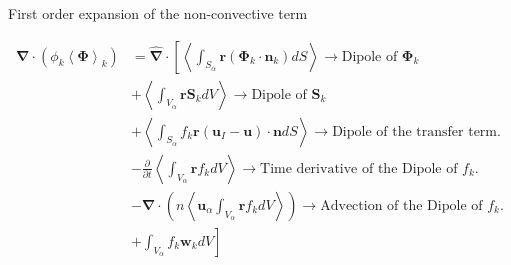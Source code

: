 \documentclass{sintefbeamer}
\newcommand{\kavg}[1]{\left<#1\right>_k}
\newcommand{\pavg}[1]{n \left<#1\right>}
\newcommand{\pnavg}[1]{\left<#1\right>}
\newcommand{\nablab}{\bm{\nabla}}
\newcommand{\nablabh}{\hat{\bm{\nabla}}}
\newcommand{\pddt}{\frac{\partial}{\partial t}}
\begin{document}
\begin{frame}
  {First order expansion of the non-convective term}

  \begin{align*}
    \nablab \cdot
    (\phi_k \kavg{\bm{\Phi}})
    & = \nablabh
    \cdot
    \left[
    \pnavg{\int_{S_\alpha}
    \textbf{r}
    (\bm{\Phi}_k \cdot \textbf{n}_k) dS}  \rightarrow \text{Dipole of $\mathbf{\Phi}_k$}
    \right. \\
      &+\pnavg{\int_{V_\alpha}
      \textbf{r}
      \textbf{S}_k dV} \rightarrow \text{Dipole of $\textbf{S}_k$}\\
      &
      + \pnavg{\int_{S_\alpha} 
      f_k\textbf{r}
      \left(\textbf{u}_I - \textbf{u}\right) \cdot \textbf{n}dS}
      \rightarrow \text{Dipole of the transfer term.}\\
      &- \pddt
      \pnavg{\int_{V_\alpha}
      \textbf{r}  f_k dV }\rightarrow \text{Time derivative of the Dipole of $f_k$.}\\
      &- \nablab \cdot\left(
        \pavg{\textbf{u}_\alpha 
        \int_{V_\alpha}
        \textbf{r}  f_k dV}
      \right)\rightarrow \text{Advection of the Dipole of $f_k$.}\\
      & \left. +\int_{V_\alpha}
      f_k
      \textbf{w}_k
      dV\right]\\
  \end{align*}
\end{frame}
\end{document}
